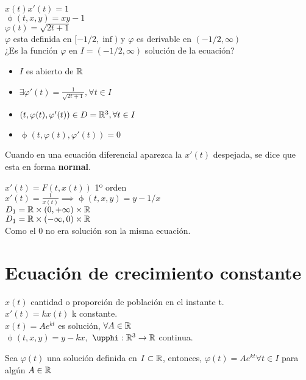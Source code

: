 \begin{ejemplo}
$x(t)x'(t) = 1$\\
$ \upphi(t,x,y) = xy - 1$\\
$ \varphi(t) = \sqrt{2t+1}  $\\

$\varphi$ esta definida en $[-1/2, \inf)$ y $\varphi$ es derivable en $(-1/2, \infty)$\\
¿Es la función $\varphi$ en $I = (-1/2, \infty)$ solución de la ecuación?

\begin{itemize}
\item $I$ es abierto de $\mathbb{R}$
\item $\exists \varphi'(t) = \frac{1}{\sqrt{2t+1}}, \forall t \in I$
\item $(t, \varphi(t), \varphi'(t)) \in D = \mathbb{R}^3, \forall t \in I$
\item $\upphi(t, \varphi(t), \varphi'(t)) = 0$
\end{itemize}

Cuando en una ecuación diferencial aparezca la $x'(t)$ despejada, se dice que esta en forma \textbf{normal}. 

$x'(t) = F(t,x(t))$ 1º orden\\

$x'(t) = \frac{1}{x(t)} \implies \upphi(t,x,y) = y - 1/x$\\
$D_1 = \mathbb{R} \times (0,+\infty )\times \mathbb{R}$\\
$D_1 = \mathbb{R} \times (-\infty ,0)\times \mathbb{R}$\\
Como el 0 no era solución son la misma ecuación.


\end{ejemplo}

\section{Ecuación de crecimiento constante}

$x(t)$ cantidad o proporción de población en el instante t.\\
$x'(t) = kx(t)$ k constante.\\
$x(t) = Ae^{kt}$ es solución, $\forall A \in \mathbb{R}$\\
$\upphi(t,x,y)= y - kx,$    $ \upphi:\R^3 \to \R$ continua.\\

\begin{nth}
Sea $\varphi(t)$ una solución definida en $I\subset \mathbb{R}$, entonces, $\varphi (t) = Ae^{kt} \forall t \in I$ para algún $A\in \mathbb{R}$

\end{nth}

